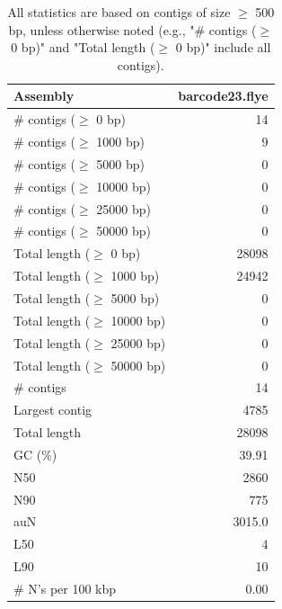 \documentclass[12pt,a4paper]{article}
\begin{document}
\begin{table}[ht]
\begin{center}
\caption{All statistics are based on contigs of size $\geq$ 500 bp, unless otherwise noted (e.g., "\# contigs ($\geq$ 0 bp)" and "Total length ($\geq$ 0 bp)" include all contigs).}
\begin{tabular}{|l*{1}{|r}|}
\hline
Assembly & barcode23.flye \\ \hline
\# contigs ($\geq$ 0 bp) & 14 \\ \hline
\# contigs ($\geq$ 1000 bp) & 9 \\ \hline
\# contigs ($\geq$ 5000 bp) & 0 \\ \hline
\# contigs ($\geq$ 10000 bp) & 0 \\ \hline
\# contigs ($\geq$ 25000 bp) & 0 \\ \hline
\# contigs ($\geq$ 50000 bp) & 0 \\ \hline
Total length ($\geq$ 0 bp) & 28098 \\ \hline
Total length ($\geq$ 1000 bp) & 24942 \\ \hline
Total length ($\geq$ 5000 bp) & 0 \\ \hline
Total length ($\geq$ 10000 bp) & 0 \\ \hline
Total length ($\geq$ 25000 bp) & 0 \\ \hline
Total length ($\geq$ 50000 bp) & 0 \\ \hline
\# contigs & 14 \\ \hline
Largest contig & 4785 \\ \hline
Total length & 28098 \\ \hline
GC (\%) & 39.91 \\ \hline
N50 & 2860 \\ \hline
N90 & 775 \\ \hline
auN & 3015.0 \\ \hline
L50 & 4 \\ \hline
L90 & 10 \\ \hline
\# N's per 100 kbp & 0.00 \\ \hline
\end{tabular}
\end{center}
\end{table}
\end{document}

